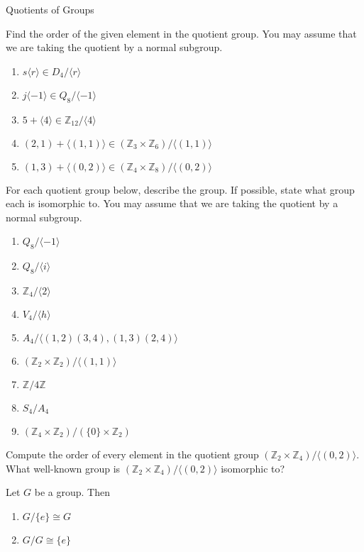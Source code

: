 \begin{section}{Quotients of Groups}
\begin{problem}%
Find the order of the given element in the quotient group. You may assume that we are taking the quotient by a normal subgroup. 
\begin{enumerate}[label=\rm{(\alph*)}]
\item $s\langle r\rangle \in D_4/\langle r\rangle$
\item $j\langle -1\rangle \in Q_8/\langle -1\rangle$
\item $5+\langle 4\rangle \in \mathbb{Z}_{12}/\langle 4\rangle$
\item $(2,1)+\langle (1,1)\rangle \in (\mathbb{Z}_3\times \mathbb{Z}_6)/\langle (1,1)\rangle$
\item $(1,3)+\langle (0,2)\rangle\in (\mathbb{Z}_4\times \mathbb{Z}_8)/\langle (0,2)\rangle$
\end{enumerate}
\end{problem}

\begin{problem}
For each quotient group below, describe the group.  If possible, state what group each is isomorphic to.  You may assume that we are taking the quotient by a normal subgroup. 
\begin{enumerate}[label=\rm{(\alph*)}]
\item $Q_8/\langle -1\rangle$
\item $Q_8/\langle i\rangle$
\item $\mathbb{Z}_4/\langle 2\rangle$
\item $V_4/\langle h\rangle$
\item $A_4/\langle (1,2)(3,4),(1,3)(2,4)\rangle$
\item $(\mathbb{Z}_2\times \mathbb{Z}_2)/\langle (1,1)\rangle$
\item $\mathbb{Z}/4\mathbb{Z}$
\item $S_4/A_4$
\item $(\mathbb{Z}_4\times \mathbb{Z}_2)/(\{0\}\times \mathbb{Z}_2)$
\end{enumerate}
\end{problem}

\begin{problem}
Compute the order of every element in the quotient group $(\mathbb{Z}_2\times \mathbb{Z}_4)/\langle (0,2)\rangle$. What well-known group is $(\mathbb{Z}_2\times \mathbb{Z}_4)/\langle (0,2)\rangle$ isomorphic to?
\end{problem}

\begin{theorem}
Let $G$ be a group.  Then
\begin{enumerate}[label=\rm{(\alph*)}]
\item $G/\{e\}\cong G$
\item $G/G\cong \{e\}$
\end{enumerate}
\end{theorem}


\end{section}
